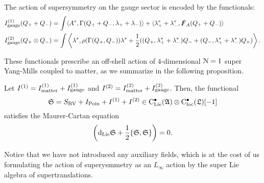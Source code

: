 \documentclass[10pt, oneside]{article}
\begin{document}
The action of supersymmetry on the gauge sector is encoded by the functionals:
\begin{align*}
I^{(1)}_{\rm gauge} (Q_+ + Q_-) & = \int \langle A^* , \Gamma(Q_+ + Q_-, \lambda_+ + \lambda_-)\rangle + \langle\lambda_+^*+\lambda_-^*, \slashed{F}_A (Q_+ + Q_-)\rangle \\
I^{(2)}_{\rm gauge} (Q_+ \otimes Q_-) & = \int \left\langle\lambda^*, \rho(\Gamma(Q_+, Q_-)) \lambda^* + \frac{1}{2} ((Q_+, \lambda_+^*+\lambda_-^*) Q_- + (Q_-, \lambda^*_+ + \lambda_-^*)Q_+)\right\rangle .
\end{align*}

These functionals prescribe an off-shell action of $4$-dimensional $\mathcal N=1$ super Yang-Mills coupled to matter, as we summarize in the following proposition.


\begin{prop}
Let $I^{(1)} = I^{(1)}_{\rm matter} + I^{(1)}_{\rm gauge}$ and $I^{(2)} = I^{(2)}_{\rm matter} + I^{(2)}_{\rm gauge}$. 
Then, the functional
\[
\mathfrak S = S_{\rm BV} + I_{\rm Poin} + I^{(1)} + I^{(2)} \in {\rm C}_{\rm Lie}^\bullet(\mathfrak{A}) \otimes {\rm C}_{\rm loc}^\bullet(\mathfrak L) [-1]
\]
satisfies the Maurer-Cartan equation
\[
\left({\rm d}_{\rm Lie} \mathfrak S + \frac{1}{2} \{\mathfrak S, \mathfrak S\} \right) = 0 .
\]
\end{prop}

Notice that we have not introduced any auxiliary fields, which is at the cost of us formulating the action of superysmmetry as an $L_\infty$ action by the super Lie algebra of supertranslations. 
\end{document}
